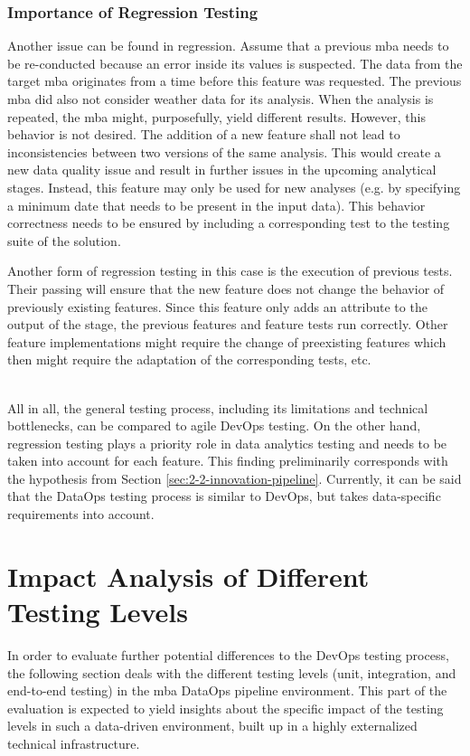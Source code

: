 \subsubsection{Importance of Regression Testing}
Another issue can be found in regression. Assume that a previous \ac{mba} needs to be re-conducted because an error inside its values is suspected. The data from the target \ac{mba} originates from a time before this feature was requested. The previous \ac{mba} did also not consider weather data for its analysis. When the analysis is repeated, the \ac{mba} might, purposefully, yield different results. However, this behavior is not desired. The addition of a new feature shall not lead to inconsistencies between two versions of the same analysis. This would create a new data quality issue and result in further issues in the upcoming analytical stages. Instead, this feature may only be used for new analyses (e.g. by specifying a minimum date that needs to be present in the input data). This behavior correctness needs to be ensured by including a corresponding test to the testing suite of the solution.

Another form of regression testing in this case is the execution of previous tests. Their passing will ensure that the new feature does not change the behavior of previously existing features. Since this feature only adds an attribute to the output of the stage, the previous features and feature tests run correctly. Other feature implementations might require the change of preexisting features which then might require the adaptation of the corresponding tests, etc. \\\

All in all, the general testing process, including its limitations and technical bottlenecks, can be compared to agile DevOps testing. On the other hand, regression testing plays a priority role in data analytics testing and needs to be taken into account for each feature. This finding preliminarily corresponds with the hypothesis from Section \ref{sec:2-2-innovation-pipeline}. Currently, it can be said that the DataOps testing process is similar to DevOps, but takes data-specific requirements into account.

\section{Impact Analysis of Different Testing Levels}
In order to evaluate further potential differences to the DevOps testing process, the following section deals with the different testing levels (unit, integration, and end-to-end testing) in the \ac{mba} DataOps pipeline environment. This part of the evaluation is expected to yield insights about the specific impact of the testing levels in such a data-driven environment, built up in a highly externalized technical infrastructure. 

